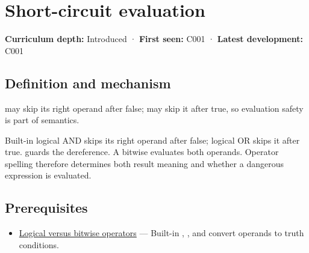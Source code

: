 \hypertarget{appendix-2e245a6fa8d3}{}\label{referencestart:appendix-2e245a6fa8d3}
\section{Short-circuit evaluation}\label{appendix-2e245a6fa8d3-short-circuit-evaluation}

\hypertarget{appendix-2e245a6fa8d3-short-circuit-evaluation}{}

\textbf{Curriculum depth:} Introduced · \textbf{First seen:} C001 · \textbf{Latest development:} C001

\begin{allmightroledefinition}

\subsection{Definition and mechanism}\label{appendix-2e245a6fa8d3-definition-and-mechanism}

\hypertarget{appendix-2e245a6fa8d3-definition-and-mechanism}{}

\BookInlineCode{{\&}{\&}}{\&\&} may skip its right operand after false; \BookInlineCode{{\textbar{}}{\textbar{}}}{\textbar{}\textbar{}} may skip it after true, so evaluation safety is part of semantics.

\end{allmightroledefinition}

Built-in logical AND skips its right operand after false; logical OR skips it after true.  guards the dereference. A bitwise \BookInlineCode{{\&}}{\&} evaluates both operands. Operator spelling therefore determines both result meaning and whether a dangerous expression is evaluated.

\subsection{Prerequisites}\label{appendix-2e245a6fa8d3-prerequisites}

\hypertarget{appendix-2e245a6fa8d3-prerequisites}{}

\begin{itemize}
\tightlist
\item
  \hyperref[appendix-fe6b457d68d8]{Logical versus bitwise operators} --- Built-in \BookInlineCode{{\&}{\&}}{\&\&}, \BookInlineCode{{\textbar{}}{\textbar{}}}{\textbar{}\textbar{}}, and \BookInlineCode{{!}}{!} convert operands to truth conditions.
\end{itemize}

